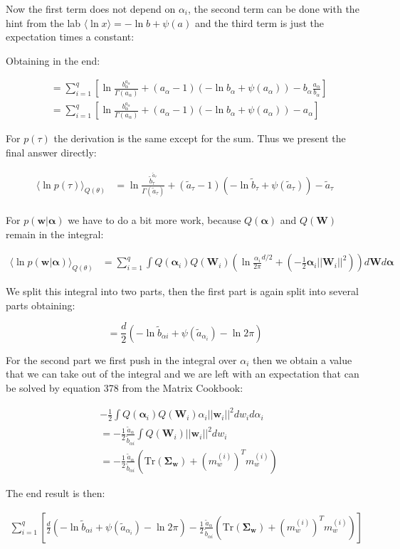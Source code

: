 \documentclass{article}
\def\*#1{\boldsymbol{#1}}
\begin{document}
Now the first term does not depend on $\alpha_i$, the second term can be done with the hint from the lab $\langle \ln x\rangle = - \ln b + \psi(a)$ and the third term is just the expectation times a constant:

Obtaining in the end:

\begin{align*}
&= \sum_{i=1}^q \left [ \ln \frac{b_\alpha^{a_\alpha}}{\Gamma(a_\alpha)} + (a_\alpha - 1)(- \ln b_\alpha + \psi(a_\alpha)) - b_\alpha \frac{a_\alpha}{b_\alpha} \right] \\
&= \sum_{i=1}^q \left [\ln \frac{b_\alpha^{a_\alpha}}{\Gamma(a_\alpha)} + (a_\alpha - 1)(- \ln b_\alpha + \psi(a_\alpha)) - a_\alpha \right ]
\end{align*}

For $p(\tau)$ the derivation is the same except for the sum. Thus we present the final answer directly:

\begin{align*}
\langle \ln p(\tau) \rangle_{Q(\theta)} &= \ln \frac{\tilde{b}_\tau^{\tilde{a}_\tau}}{\Gamma(\tilde{a}_\tau)} + (\tilde{a}_\tau - 1)(- \ln \tilde{b}_\tau + \psi(\tilde{a}_\tau)) - \tilde{a}_\tau \\
\end{align*}

For $p(\*w|\*\alpha)$ we have to do a bit more work, because $Q(\*\alpha)$ and $Q(\*W)$ remain in the integral:

\begin{align*}
\langle \ln p(\*w|\*\alpha) \rangle_{Q(\theta)} &= \sum_{i = 1}^q \int Q(\*\alpha_i)Q(\*W_i)(\ln \frac{\alpha_i}{2\pi}^{d/2} + (- \frac12 \*\alpha_i ||\*W_i||^2 )) d\*W d\*\alpha
\end{align*}

We split this integral into two parts, then the first part is again split into several parts obtaining:

$$= \frac{d}{2}( - \ln \tilde{b}_{\alpha i} + \psi(\tilde{a}_{\alpha_i}) - \ln 2\pi)$$

For the second part we first push in the integral over $\alpha_i$ then we obtain a value that we can take out of the integral and we are left with an expectation that can be solved by equation 378 from the Matrix Cookbook:

\begin{align*}
& - \frac12 \int Q(\*\alpha_i) Q(\*W_i) \alpha_i ||\*w_i||^2 dw_i d\alpha_i \\
&= - \frac12 \frac{\tilde{a}_\alpha}{\tilde{b}_{\alpha i}} \int Q(\*W_i) ||\*w_i||^2 dw_i \\
&= - \frac12 \frac{\tilde{a}_\alpha}{\tilde{b}_{\alpha i}} (\mbox{Tr}(\*{\Sigma_w}) + (m_w^{(i)})^T m_w^{(i)} )
\end{align*}

The end result is then:

\begin{align*}
\sum_{i = 1}^q \left [ \frac{d}{2}( - \ln \tilde{b}_{\alpha i} + \psi(\tilde{a}_{\alpha_i}) - \ln 2\pi) - \frac12 \frac{\tilde{a}_\alpha}{\tilde{b}_{\alpha i}} (\mbox{Tr}(\*{\Sigma_w}) + (m_w^{(i)})^T m_w^{(i)} ) \right ]
\end{align*}
\end{document}

